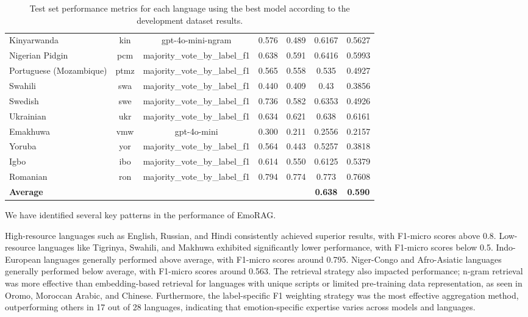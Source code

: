 \documentclass[a4paper,12pt]{extarticle}
\begin{document}
\begin{table}[th!]
{\begin{tabular}{@{}lcccccc@{}}
Kinyarwanda & kin & gpt-4o-mini-ngram & 0.576 & 0.489 & 0.6167 & 0.5627 \\
Nigerian Pidgin & pcm & majority\_vote\_by\_label\_f1 & 0.638 & 0.591 & 0.6416 & 0.5993 \\
Portuguese (Mozambique) & ptmz & majority\_vote\_by\_label\_f1 & 0.565 & 0.558 & 0.535 & 0.4927 \\
Swahili & swa & majority\_vote\_by\_label\_f1 & 0.440 & 0.409 & 0.43 & 0.3856 \\
Swedish & swe & majority\_vote\_by\_label\_f1 & 0.736 & 0.582 & 0.6353 & 0.4926 \\
Ukrainian & ukr & majority\_vote\_by\_label\_f1 & 0.634 & 0.621 & 0.638 & 0.6161 \\
Emakhuwa & vmw & gpt-4o-mini & 0.300 & 0.211 & 0.2556 & 0.2157 \\
Yoruba & yor & majority\_vote\_by\_label\_f1 & 0.564 & 0.443 & 0.5257 & 0.3818 \\
Igbo & ibo & majority\_vote\_by\_label\_f1 & 0.614 & 0.550 & 0.6125 & 0.5379 \\
Romanian & ron & majority\_vote\_by\_label\_f1 & 0.794 & 0.774 & 0.773 & 0.7608 \\ \midrule
\textbf{Average} & & & & & \textbf{0.638} & \textbf{0.590} \\ \bottomrule
\end{tabular}
}
\caption{Test set performance metrics for each language using the best model according to the development dataset results.}
\label{tab:test_metrics}
\end{table}


We have identified several key patterns in the performance of EmoRAG.

High-resource languages such as English, Russian, and Hindi consistently achieved superior results, with F1-micro scores above 0.8. 
Low-resource languages like Tigrinya, Swahili, and Makhuwa exhibited significantly lower performance, with F1-micro scores below 0.5.
Indo-European languages generally performed above average, with F1-micro scores around 0.795. 
Niger-Congo  and Afro-Asiatic languages generally performed below average, with F1-micro scores around 0.563. 
The retrieval strategy also impacted performance; n-gram retrieval was more effective than embedding-based retrieval for languages with unique scripts or limited pre-training data representation, as seen in Oromo, Moroccan Arabic, and Chinese. Furthermore, the label-specific F1 weighting strategy was the most effective aggregation method, outperforming others in 17 out of 28 languages, indicating that emotion-specific expertise varies across models and languages.
\end{document}
